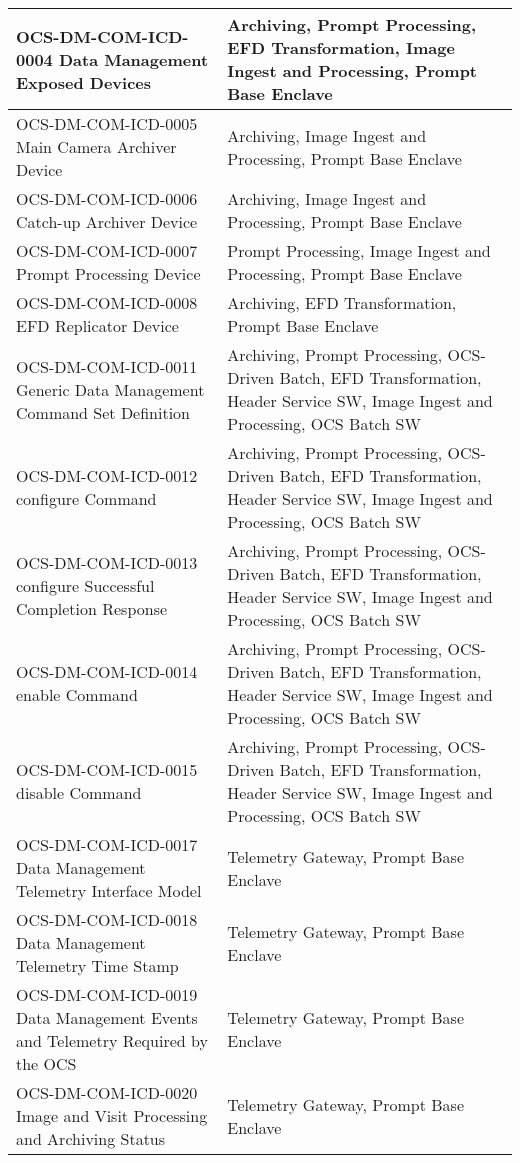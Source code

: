 \begin{longtable}{p{}p{}}
OCS-DM-COM-ICD-0004 Data Management Exposed Devices & Archiving, Prompt Processing, EFD Transformation, Image Ingest and Processing, Prompt Base Enclave \\ \hline
OCS-DM-COM-ICD-0005 Main Camera Archiver Device & Archiving, Image Ingest and Processing, Prompt Base Enclave \\ \hline
OCS-DM-COM-ICD-0006 Catch-up Archiver Device & Archiving, Image Ingest and Processing, Prompt Base Enclave \\ \hline
OCS-DM-COM-ICD-0007 Prompt Processing Device & Prompt Processing, Image Ingest and Processing, Prompt Base Enclave \\ \hline
OCS-DM-COM-ICD-0008 EFD Replicator Device & Archiving, EFD Transformation, Prompt Base Enclave \\ \hline
OCS-DM-COM-ICD-0011 Generic Data Management Command Set Definition & Archiving, Prompt Processing, OCS-Driven Batch, EFD Transformation, Header Service SW, Image Ingest and Processing, OCS Batch SW \\ \hline
OCS-DM-COM-ICD-0012 configure Command & Archiving, Prompt Processing, OCS-Driven Batch, EFD Transformation, Header Service SW, Image Ingest and Processing, OCS Batch SW \\ \hline
OCS-DM-COM-ICD-0013 configure Successful Completion Response & Archiving, Prompt Processing, OCS-Driven Batch, EFD Transformation, Header Service SW, Image Ingest and Processing, OCS Batch SW \\ \hline
OCS-DM-COM-ICD-0014 enable Command & Archiving, Prompt Processing, OCS-Driven Batch, EFD Transformation, Header Service SW, Image Ingest and Processing, OCS Batch SW \\ \hline
OCS-DM-COM-ICD-0015 disable Command & Archiving, Prompt Processing, OCS-Driven Batch, EFD Transformation, Header Service SW, Image Ingest and Processing, OCS Batch SW \\ \hline
OCS-DM-COM-ICD-0017 Data Management Telemetry Interface Model & Telemetry Gateway, Prompt Base Enclave \\ \hline
OCS-DM-COM-ICD-0018 Data Management Telemetry Time Stamp & Telemetry Gateway, Prompt Base Enclave \\ \hline
OCS-DM-COM-ICD-0019 Data Management Events and Telemetry Required by the OCS & Telemetry Gateway, Prompt Base Enclave \\ \hline
OCS-DM-COM-ICD-0020 Image and Visit Processing and Archiving Status & Telemetry Gateway, Prompt Base Enclave \\ \hline

\end{longtable}
